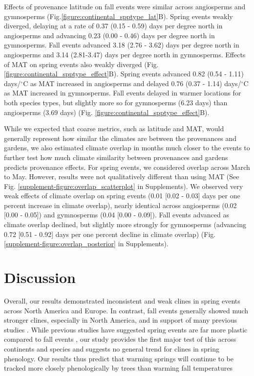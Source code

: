 \documentclass{article}
\begin{document}
Effects of provenance latitude on fall events were similar across angiosperms and gymnosperms (Fig.\ref{figure:continental_spptype_lat}B). Spring events weakly diverged, delaying at a rate of 0.37 (0.15 - 0.59) days per degree north in angiosperms and advancing 0.23 (0.00 - 0.46) days per degree north in gymnosperms. Fall events advanced 3.18 (2.76 - 3.62) days per degree north in angiosperms and 3.14 (2.81-3.47) days per degree north in gymnosperms.
Effects of MAT on spring events also weakly diverged (Fig.\ref{figure:continental_spptype_effect}B). Spring events advanced 0.82 (0.54 - 1.11) days/$^{\circ}$C as MAT increased in angiosperms and delayed 0.76 (0.37 - 1.14) days/$^{\circ}$C as MAT increased in gymnosperms. Fall events delayed in warmer locations for both species types, but slightly more so for gymnosperms (6.23 days) than angiosperms (3.69 days) (Fig. \ref{figure:continental_spptype_effect}B).

While we expected that coarse metrics, such as latitude and MAT, would generally represent how similar the climates are between the provenances and gardens, we also estimated climate overlap in months much closer to the events to further test how much climate similarity between provenances and gardens predicts provenance effects. For spring events, we considered overlap across March to May. However, results were not qualitatively different than using MAT (See Fig. \ref{supplement-figure:overlap_scatterplot} in Supplements). We observed very weak effects of climate overlap on spring events (0.01 [0.02 - 0.03] days per one percent increase in climate overlap), nearly identical across angiosperms (0.02 [0.00 - 0.05]) and gymnosperms (0.04 [0.00 - 0.09]). Fall events advanced as climate overlap declined, but slightly more strongly for gymnosperms (advancing 0.72 [0.51 - 0.92] days per one percent decline in climate overlap) (Fig.\ref{supplement-figure:overlap_posterior} in Supplements).


\section{Discussion}

Overall, our results demonstrated inconsistent and weak clines in spring events across North America and Europe. In contrast, fall events generally showed much stronger clines, especially in North America, and in support of many previous studies \citep{AitkenBemmels16, Alberto13}. While previous studies have suggested spring events are far more plastic compared to fall events \citep{Li97,farmer93,mimura07}, our study provides the first major test of this across continents and species and suggests no general trend for clines in spring phenology. Our results thus predict that warming springs will continue to be tracked more closely phenologically by trees than warming fall temperatures \citep{IPCC22}
\end{document}
